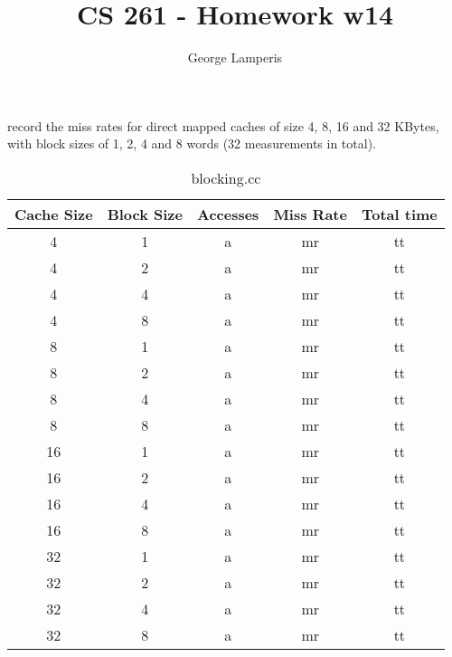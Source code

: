 \documentclass[letterpaper, 12pt, oneside]{memoir}
\title{CS 261 - Homework w14}
\author{George Lamperis}
\date{}
\begin{document}
\maketitle

record the miss rates for direct mapped caches of size 4, 8, 16 and 32 KBytes,
with block sizes of 1, 2, 4 and 8 words (32 measurements in total). 

\begin{table}[H]
\centering
\begin{tabular}{c|c|c|c|c}
    Cache Size  & Block Size    & Accesses & Miss Rate & Total time \\ \hline
    4   & 1 & a & mr & tt \\ 
    4   & 2 & a & mr & tt \\ 
    4   & 4 & a & mr & tt \\ 
    4   & 8 & a & mr & tt \\ 
    8   & 1 & a & mr & tt \\ 
    8   & 2 & a & mr & tt \\ 
    8   & 4 & a & mr & tt \\ 
    8   & 8 & a & mr & tt \\ 
    16  & 1 & a & mr & tt \\ 
    16  & 2 & a & mr & tt \\ 
    16  & 4 & a & mr & tt \\ 
    16  & 8 & a & mr & tt \\ 
    32  & 1 & a & mr & tt \\ 
    32  & 2 & a & mr & tt \\ 
    32  & 4 & a & mr & tt \\ 
    32  & 8 & a & mr & tt \\ 
\end{tabular}
\caption{blocking.cc}
\end{table}
\end{document}
